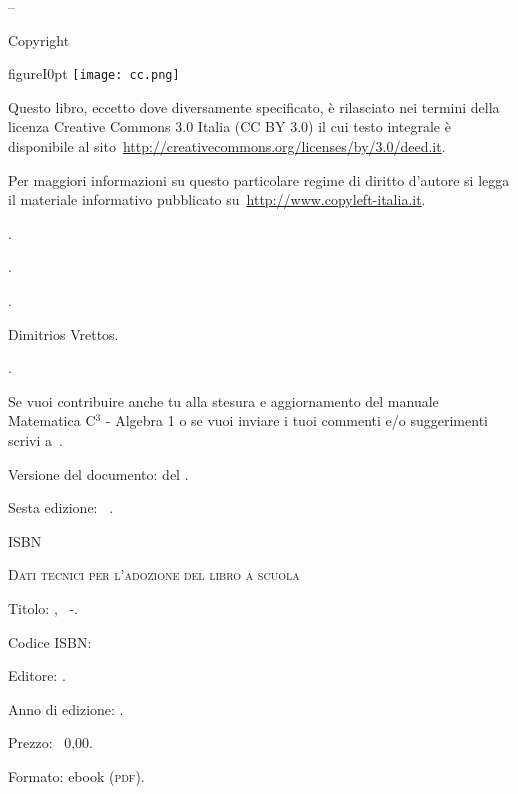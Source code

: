\thispagestyle{empty}
{\setlength{\parindent}{0em}\small{
\begin{center}
{\large{\serie – \titolo}}

Copyright {\textcopyright} {\anno} \editore
\end{center}

\begin{wrapfloat}{figure}{I}{0pt}
\texttt{[image: cc.png]}
\end{wrapfloat}

Questo libro, eccetto dove diversamente specificato, è rilasciato nei termini 
della licenza Creative Commons 3.0 Italia
(CC BY 3.0) il cui testo integrale è disponibile al 
sito~\url{http://creativecommons.org/licenses/by/3.0/deed.it}.

Per maggiori informazioni su questo particolare regime di diritto d'autore si 
legga il materiale informativo pubblicato su~\url{http://www.copyleft-italia.it}.

 \coord .

 \autori.

 \colab.

 {Dimitrios Vrettos}.

 {\texcol}.

 Se vuoi contribuire anche tu alla stesura e aggiornamento 
del manuale Matematica C$^3$ - Algebra 1 o se  vuoi inviare i tuoi commenti e/o suggerimenti scrivi 
a~.

\vspace{2ex}
 Versione del documento: {\docvers} del {\oggi}.

Sesta edizione: \mese\ \anno.

 ISBN \mcisbn

\vspace{2ex}
 {\scshape{Dati tecnici per l'adozione del libro a scuola}}

 Titolo: \serie, \titolo\ -\edizione.

 Codice ISBN: \mcisbn 

 Editore: \href{http://www.matematicamente.it}{\editore}. 

 Anno di edizione: \anno.

 Prezzo: \officialeuro\ 0,00.

 Formato: ebook (\scshape{pdf}).
}}
\cleardoublepage
